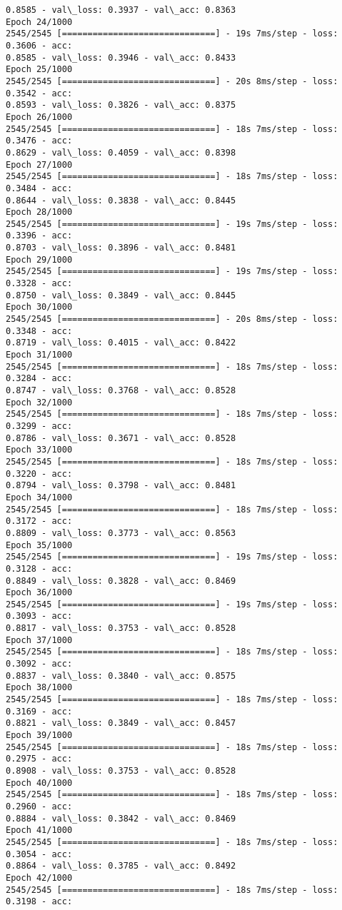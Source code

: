 \documentclass[11pt]{article}
\begin{document}
\begin{Verbatim}[commandchars=\\\{\}]
0.8585 - val\_loss: 0.3937 - val\_acc: 0.8363
Epoch 24/1000
2545/2545 [==============================] - 19s 7ms/step - loss: 0.3606 - acc:
0.8585 - val\_loss: 0.3946 - val\_acc: 0.8433
Epoch 25/1000
2545/2545 [==============================] - 20s 8ms/step - loss: 0.3542 - acc:
0.8593 - val\_loss: 0.3826 - val\_acc: 0.8375
Epoch 26/1000
2545/2545 [==============================] - 18s 7ms/step - loss: 0.3476 - acc:
0.8629 - val\_loss: 0.4059 - val\_acc: 0.8398
Epoch 27/1000
2545/2545 [==============================] - 18s 7ms/step - loss: 0.3484 - acc:
0.8644 - val\_loss: 0.3838 - val\_acc: 0.8445
Epoch 28/1000
2545/2545 [==============================] - 19s 7ms/step - loss: 0.3396 - acc:
0.8703 - val\_loss: 0.3896 - val\_acc: 0.8481
Epoch 29/1000
2545/2545 [==============================] - 19s 7ms/step - loss: 0.3328 - acc:
0.8750 - val\_loss: 0.3849 - val\_acc: 0.8445
Epoch 30/1000
2545/2545 [==============================] - 20s 8ms/step - loss: 0.3348 - acc:
0.8719 - val\_loss: 0.4015 - val\_acc: 0.8422
Epoch 31/1000
2545/2545 [==============================] - 18s 7ms/step - loss: 0.3284 - acc:
0.8747 - val\_loss: 0.3768 - val\_acc: 0.8528
Epoch 32/1000
2545/2545 [==============================] - 18s 7ms/step - loss: 0.3299 - acc:
0.8786 - val\_loss: 0.3671 - val\_acc: 0.8528
Epoch 33/1000
2545/2545 [==============================] - 18s 7ms/step - loss: 0.3220 - acc:
0.8794 - val\_loss: 0.3798 - val\_acc: 0.8481
Epoch 34/1000
2545/2545 [==============================] - 18s 7ms/step - loss: 0.3172 - acc:
0.8809 - val\_loss: 0.3773 - val\_acc: 0.8563
Epoch 35/1000
2545/2545 [==============================] - 19s 7ms/step - loss: 0.3128 - acc:
0.8849 - val\_loss: 0.3828 - val\_acc: 0.8469
Epoch 36/1000
2545/2545 [==============================] - 19s 7ms/step - loss: 0.3093 - acc:
0.8817 - val\_loss: 0.3753 - val\_acc: 0.8528
Epoch 37/1000
2545/2545 [==============================] - 18s 7ms/step - loss: 0.3092 - acc:
0.8837 - val\_loss: 0.3840 - val\_acc: 0.8575
Epoch 38/1000
2545/2545 [==============================] - 18s 7ms/step - loss: 0.3169 - acc:
0.8821 - val\_loss: 0.3849 - val\_acc: 0.8457
Epoch 39/1000
2545/2545 [==============================] - 18s 7ms/step - loss: 0.2975 - acc:
0.8908 - val\_loss: 0.3753 - val\_acc: 0.8528
Epoch 40/1000
2545/2545 [==============================] - 18s 7ms/step - loss: 0.2960 - acc:
0.8884 - val\_loss: 0.3842 - val\_acc: 0.8469
Epoch 41/1000
2545/2545 [==============================] - 18s 7ms/step - loss: 0.3054 - acc:
0.8864 - val\_loss: 0.3785 - val\_acc: 0.8492
Epoch 42/1000
2545/2545 [==============================] - 18s 7ms/step - loss: 0.3198 - acc:

\end{Verbatim}
\end{document}
